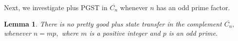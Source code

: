 \documentclass[12pt,a4paper]{article}
\newtheorem{lem}{Lemma}
\def \e {{\bf e}}
\def \e {{\mathbf e}}
\newcommand{\ob}[1]{\left(#1\right)}
\begin{document}
Next, we investigate plus PGST in $\overline{C_n}$ whenever $n$ has an odd prime factor.

\begin{lem}\label{5lemm6}
There is no pretty good plus state transfer in the complement $\overline{C_n},$ whenever $n=mp,$ where $m$ is a positive integer and $p$ is an odd prime.
\end{lem}
\end{document}
